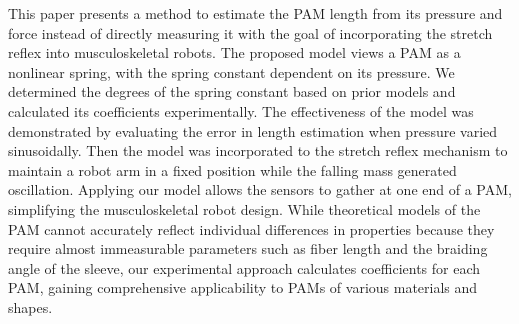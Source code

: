 This paper presents a method to estimate the PAM length from its pressure and force instead of directly measuring it with the goal of incorporating the stretch reflex into musculoskeletal robots.
The proposed model views a PAM as a nonlinear spring, with the spring constant dependent on its pressure. 
We determined the degrees of the spring constant based on prior models and calculated its coefficients experimentally.
The effectiveness of the model was demonstrated by evaluating the error in length estimation when pressure varied sinusoidally.
Then the model was incorporated to the stretch reflex mechanism to maintain a robot arm in a fixed position while the falling mass generated oscillation.
Applying our model allows the sensors to gather at one end of a PAM, simplifying the musculoskeletal robot design. 
While theoretical models of the PAM cannot accurately reflect individual differences in properties because they require almost immeasurable parameters such as fiber length and the braiding angle of the sleeve\cite{motion}, 
our experimental approach calculates coefficients for each PAM, gaining comprehensive applicability to PAMs of various materials and shapes.

